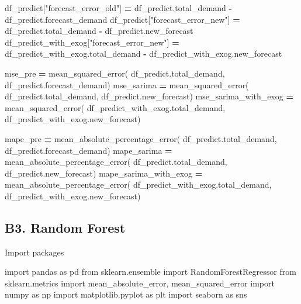 \documentclass[mstat,12pt]{unswthesis}
\newenvironment{Shaded}{\begin{snugshade}}{\end{snugshade}}
\newcommand{\ImportTok}[1]{#1}
\newcommand{\NormalTok}[1]{#1}
\newcommand{\OperatorTok}[1]{\textcolor[rgb]{0.81,0.36,0.00}{\textbf{#1}}}
\newcommand{\StringTok}[1]{\textcolor[rgb]{0.31,0.60,0.02}{#1}}
\begin{document}
\begin{Shaded}
\begin{Highlighting}[]
\NormalTok{df\_predict[}\StringTok{"forecast\_error\_old"}\NormalTok{] }\OperatorTok{=} 
\NormalTok{    df\_predict.total\_demand }\OperatorTok{{-}}\NormalTok{ df\_predict.forecast\_demand}
\NormalTok{df\_predict[}\StringTok{"forecast\_error\_new"}\NormalTok{] }\OperatorTok{=} 
\NormalTok{    df\_predict.total\_demand }\OperatorTok{{-}}\NormalTok{ df\_predict.new\_forecast}
\NormalTok{df\_predict\_with\_exog[}\StringTok{"forecast\_error\_new"}\NormalTok{] }\OperatorTok{=} 
\NormalTok{    df\_predict\_with\_exog.total\_demand }\OperatorTok{{-}}\NormalTok{ df\_predict\_with\_exog.new\_forecast}

\NormalTok{mse\_pre }\OperatorTok{=}\NormalTok{ mean\_squared\_error(}
\NormalTok{      df\_predict.total\_demand, df\_predict.forecast\_demand)}
\NormalTok{mse\_sarima }\OperatorTok{=}\NormalTok{ mean\_squared\_error(}
\NormalTok{      df\_predict.total\_demand, df\_predict.new\_forecast)}
\NormalTok{mse\_sarima\_with\_exog }\OperatorTok{=}\NormalTok{ mean\_squared\_error(}
\NormalTok{      df\_predict\_with\_exog.total\_demand, }
\NormalTok{      df\_predict\_with\_exog.new\_forecast)}

\NormalTok{mape\_pre }\OperatorTok{=}\NormalTok{ mean\_absolute\_percentage\_error(}
\NormalTok{      df\_predict.total\_demand, df\_predict.forecast\_demand)}
\NormalTok{mape\_sarima }\OperatorTok{=}\NormalTok{ mean\_absolute\_percentage\_error(}
\NormalTok{      df\_predict.total\_demand, df\_predict.new\_forecast)}
\NormalTok{mape\_sarima\_with\_exog }\OperatorTok{=}\NormalTok{ mean\_absolute\_percentage\_error(}
\NormalTok{      df\_predict\_with\_exog.total\_demand, }
\NormalTok{      df\_predict\_with\_exog.new\_forecast)}
\end{Highlighting}
\end{Shaded}

\subsection*{B3. Random Forest}\label{b3.-random-forest}

Import packages

\begin{Shaded}
\begin{Highlighting}[]
\ImportTok{import}\NormalTok{ pandas }\ImportTok{as}\NormalTok{ pd}
\ImportTok{from}\NormalTok{ sklearn.ensemble }\ImportTok{import}\NormalTok{ RandomForestRegressor}
\ImportTok{from}\NormalTok{ sklearn.metrics }\ImportTok{import}\NormalTok{ mean\_absolute\_error, mean\_squared\_error}
\ImportTok{import}\NormalTok{ numpy }\ImportTok{as}\NormalTok{ np}
\ImportTok{import}\NormalTok{ matplotlib.pyplot }\ImportTok{as}\NormalTok{ plt}
\ImportTok{import}\NormalTok{ seaborn }\ImportTok{as}\NormalTok{ sns}
\end{Highlighting}
\end{Shaded}
\end{document}
